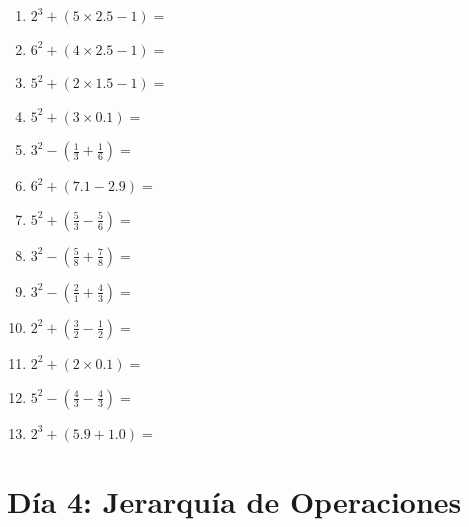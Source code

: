\documentclass[12pt]{article}
\begin{document}
\begin{enumerate}
\item \large $ 2^{3} + (5 \times 2.5 - 1) = $ \vspace{1.4cm}
\newpage
\item \large $ 6^{2} + (4 \times 2.5 - 1) = $ \vspace{1.4cm}
\item \large $ 5^{2} + (2 \times 1.5 - 1) = $ \vspace{1.4cm}
\item \large $ 5^{2} + (3 \times 0.1) = $ \vspace{1.4cm}
\item \large $ 3^{2} - (\frac{1}{3} + \frac{1}{6}) = $ \vspace{1.4cm}
\item \large $ 6^{2} + (7.1 - 2.9) = $ \vspace{1.4cm}
\item \large $ 5^{2} + (\frac{5}{3} - \frac{5}{6}) = $ \vspace{1.4cm}
\item \large $ 3^{2} - (\frac{5}{8} + \frac{7}{8}) = $ \vspace{1.4cm}
\item \large $ 3^{2} - (\frac{2}{1} + \frac{4}{3}) = $ \vspace{1.4cm}
\item \large $ 2^{2} + (\frac{3}{2} - \frac{1}{2}) = $ \vspace{1.4cm}
\item \large $ 2^{2} + (2 \times 0.1) = $ \vspace{1.4cm}
\newpage
\item \large $ 5^{2} - (\frac{4}{3} - \frac{4}{3}) = $ \vspace{1.4cm}
\item \large $ 2^{3} + (5.9 + 1.0) = $ \vspace{1.4cm}
\end{enumerate}
\newpage
\section*{Día 4: Jerarquía de Operaciones}
\end{document}
